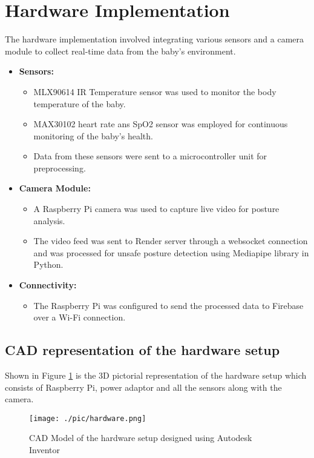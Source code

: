 \documentclass[12pt,a4paper]{report}
\begin{document}
\section{Hardware Implementation}
The hardware implementation involved integrating various sensors and a camera module to collect real-time data from the baby's environment.
\begin{itemize}
  \item \textbf{Sensors:}
  \begin{itemize}
    \item MLX90614 IR Temperature sensor was used to monitor the body temperature of the baby.
    \item MAX30102 heart rate ans SpO2 sensor was employed for continuous monitoring of the baby’s health.
    \item Data from these sensors were sent to a microcontroller unit for preprocessing.
  \end{itemize}
  \item \textbf{Camera Module:}
  \begin{itemize}
    \item A Raspberry Pi camera was used to capture live video for posture analysis.
    \item The video feed was sent to Render server through a websocket connection and was processed for unsafe posture detection using Mediapipe library in Python.
  \end{itemize}
  \item \textbf{Connectivity:}
  \begin{itemize}
    \item The Raspberry Pi was configured to send the processed data to Firebase over a Wi-Fi connection.
  \end{itemize}
\end{itemize}
\subsection{CAD representation of the hardware setup}
Shown in Figure \ref{fig:hardware} is the 3D pictorial representation of the hardware setup which consists of Raspberry Pi, power adaptor and all the sensors along with the camera.
\begin{figure}[H]
  \centering
  \texttt{[image: ./pic/hardware.png]}
  \caption{CAD Model of the hardware setup designed using Autodesk Inventor}
  \label{fig:hardware}
\end{figure}
\end{document}
